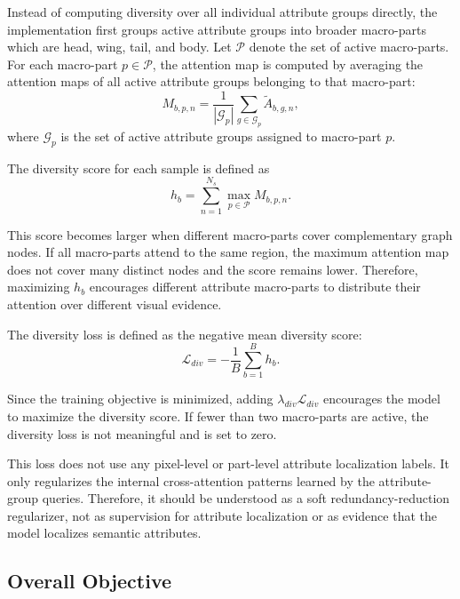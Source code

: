 Instead of computing diversity over all individual attribute groups directly, the implementation first groups active attribute groups into broader macro-parts which are head, wing, tail, and body. Let \(\mathcal{P}\) denote the set of active macro-parts. For each macro-part \(p \in \mathcal{P}\), the attention map is computed by averaging the attention maps of all active attribute groups belonging to that macro-part:
\begin{equation}
    M_{b,p,n}
    =
    \frac{1}{|\mathcal{G}_{p}|}
    \sum_{g \in \mathcal{G}_{p}}
    \tilde{A}_{b,g,n},
    \label{eq:macro_attn}
\end{equation}
where \(\mathcal{G}_{p}\) is the set of active attribute groups assigned to macro-part \(p\).

The diversity score for each sample is defined as
\begin{equation}
    h_b
    =
    \sum_{n=1}^{N_s}
    \max_{p \in \mathcal{P}}
    M_{b,p,n}.
    \label{eq:h_score}
\end{equation}

This score becomes larger when different macro-parts cover complementary graph nodes. If all macro-parts attend to the same region, the maximum attention map does not cover many distinct nodes and the score remains lower. Therefore, maximizing \(h_b\) encourages different attribute macro-parts to distribute their attention over different visual evidence.

The diversity loss is defined as the negative mean diversity score:
\begin{equation}
    \mathcal{L}_{div}
    =
    -
    \frac{1}{B}
    \sum_{b=1}^{B}
    h_b.
    \label{eq:div_loss}
\end{equation}

Since the training objective is minimized, adding \(\lambda_{div}\mathcal{L}_{div}\) encourages the model to maximize the diversity score. If fewer than two macro-parts are active, the diversity loss is not meaningful and is set to zero.

This loss does not use any pixel-level or part-level attribute localization labels. It only regularizes the internal cross-attention patterns learned by the attribute-group queries. Therefore, it should be understood as a soft redundancy-reduction regularizer, not as supervision for attribute localization or as evidence that the model localizes semantic attributes.

\subsection{Overall Objective}

